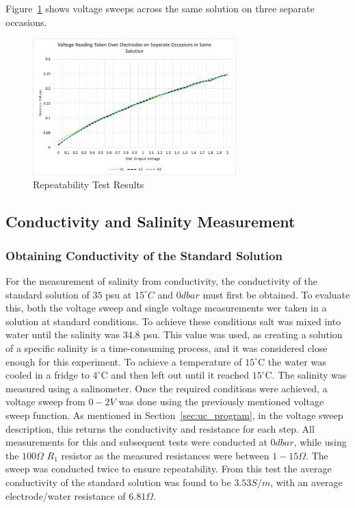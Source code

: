 Figure~\ref{fig:repeatability_test} shows voltage sweeps across the same solution on three separate occasions.
\begin{figure}[H]
    \centering
    \includegraphics[width=0.7\textwidth]{figures/repeatability_test.png}
    \caption{Repeatability Test Results}
    \label{fig:repeatability_test}
\end{figure}

\subsection{Conductivity and Salinity Measurement}

\subsubsection{Obtaining Conductivity of the Standard Solution}
For the measurement of salinity from conductivity, the conductivity of the standard solution of $35$ \gls{psu} at $15^{\circ}C$ and $0dbar$ must first be obtained.
To evaluate this, both the voltage sweep and single voltage measurements wer taken in a solution at standard conditions.
To achieve these conditions salt was mixed into water until the salinity was 34.8 \gls{psu}.
This value was used, as creating a solution of a specific salinity is a time-consuming process, and it was considered close enough for this experiment.
To achieve a temperature of $15^\circ$C the water was cooled in a fridge to $4^\circ$C and then left out until it reached $15^\circ$C.
The salinity was measured using a salinometer.
Once the required conditions were achieved, a voltage sweep from $0-2V$ was done using the previously mentioned voltage sweep function.
As mentioned in Section~\ref{sec:uc_program}, in the voltage sweep description, this returns the conductivity and resistance for each step.
All measurements for this and subsequent tests were conducted at $0dbar$, while using the $100\Omega$ $R_1$ resistor as the measured resistances were between $1-15\Omega$.
The sweep was conducted twice to ensure repeatability.
From this test the average conductivity of the standard solution was found to be $3.53 S/m$, with an average electrode/water resistance of $6.81\Omega$.

